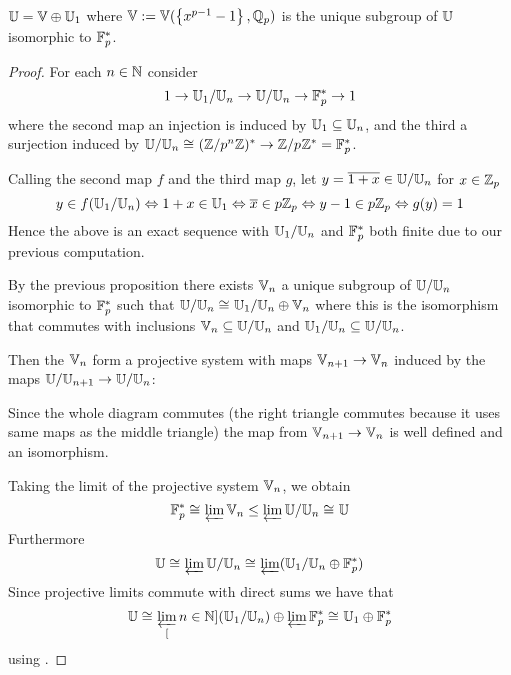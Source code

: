 \begin{prop}[Decomposition of $\U$]
    $\mathbb{U} = \mathbb{V} \oplus \mathbb{U}_1$ where 
    $\mathbb{V} := \mathbb{V}(\left\{x^{p-1} - 1\right\},\mathbb{Q}_p)$ 
    is the unique subgroup of $\U$ isomorphic to $\mathbb{F}^*_p$.
\end{prop}
\begin{proof}
    For each $n \in \mathbb{N}$ consider 
    \[1 \to \mathbb{U}_1 / \mathbb{U}_n \to \mathbb{U} / \mathbb{U}_n \to \mathbb{F}_p^* \to 1\]
    where the second map an injection is induced by 
    $\mathbb{U}_1 \subseteq \mathbb{U}_n$,
    and the third a surjection induced by 
    $\mathbb{U} / \mathbb{U}_n \cong_{} (\mathbb{Z}/p^{n}\mathbb{Z})^* \to \mathbb{Z}/p^{ }\mathbb{Z}^* = \mathbb{F}_p^*$.

    Calling the second map $f$ and the third map $g$,
    let $y = \overline{1 + x} \in \mathbb{U} / \mathbb{U}_n$ for $x \in \mathbb{Z}_p$
    \[y \in f(\mathbb{U}_1/\mathbb{U}_n) \Leftrightarrow 1 + x \in \mathbb{U}_1 
    \Leftrightarrow \overline{x} \in p \mathbb{Z}_p \Leftrightarrow y - 1 \in p \mathbb{Z}_p
    \Leftrightarrow g(y) = 1\]
    Hence the above is an exact sequence with 
    $\mathbb{U}_1 / \mathbb{U}_n$ and $\mathbb{F}_p^*$ 
    both finite due to our previous computation.

    By the previous proposition there exists $\mathbb{V}_n$
    a unique subgroup of $\mathbb{U} / \mathbb{U}_n$ isomorphic to $\mathbb{F}_p^*$
    such that $\mathbb{U} / \mathbb{U}_n \cong_{} \mathbb{U}_1 / \mathbb{U}_n \oplus \mathbb{V}_n$ where this 
    is the isomorphism that commutes with inclusions 
    $\mathbb{V}_n \subseteq \mathbb{U} / \mathbb{U}_n $ and 
    $\mathbb{U}_1 / \mathbb{U}_n \subseteq \mathbb{U} / \mathbb{U}_n$.

    Then the $\mathbb{V}_n$ form a projective system 
    with maps $\mathbb{V}_{n+1} \to \mathbb{V}_n$ induced by 
    the maps $\mathbb{U} / \mathbb{U}_{n+1} \to \mathbb{U} / \mathbb{U}_n$:
    \begin{center}
    \end{center}
    Since the whole diagram commutes
    (the right triangle commutes because it uses 
    same maps as the middle triangle)
    the map from $\mathbb{V}_{n+1} \to \mathbb{V}_n$ 
    is well defined and an isomorphism.

    Taking the limit of the projective system 
    $\mathbb{V}_n$, we obtain 
    \[\mathbb{F}_p^* \cong_{} \varprojlim \mathbb{V}_n \le 
    \varprojlim \mathbb{U} / \mathbb{U}_n \cong_{} \mathbb{U}\]
    Furthermore 
    \[\mathbb{U} \cong_{} \varprojlim \mathbb{U} / \mathbb{U}_n 
    \cong_{} \varprojlim (\mathbb{U}_1 / \mathbb{U}_n \oplus \mathbb{F}_p^*)
    \]
    Since projective limits commute with direct sums %
    we have that 
    \[\mathbb{U} \cong_{} \varprojlim_{[}n \in \mathbb{N}] (\mathbb{U}_1 / \mathbb{U}_n) \oplus \varprojlim \mathbb{F}_p^*
    \cong_{} \mathbb{U}_1 \oplus \mathbb{F}_p^*
    \]
    using .


\end{proof}
